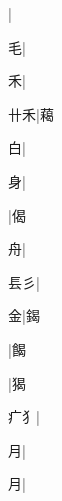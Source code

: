 \begin{multicols}{2}
{{}|{}\par
{\cjk{}{\cnsym{}　}{\cnsym{}　}毛}|{}\par
{\cjk{}{\cnsym{}　}{\cnsym{}　}禾}|{}\par
{\cjk{}{\cnsym{}　}卄禾}|{\cjk{}藒}\par
{\cjk{}{\cnsym{}　}{\cnsym{}　}白}|{}\par
{\cjk{}{\cnsym{}　}{\cnsym{}　}身}|{}\par
{}|{\cjk{}偈}\par
{\cjk{}{\cnsym{}　}{\cnsym{}　}舟}|{}\par
{\cjk{}{\cnsym{}　}镸彡}|{}\par
{\cjk{}{\cnsym{}　}{\cnsym{}　}金}|{\cjk{}鍻}\par
{}|{\cjk{}餲}\par
{}|{\cjk{}猲}\par
{\cjk{}{\cnsym{}　}疒{犭}}|{}\par
{\cjk{}{\cnsym{}　}{\cnsym{}　}月}|{}\par
{\cjk{}{\cnsym{}　}{\cnsym{}　}月}|{}\par
}
\end{multicols}
